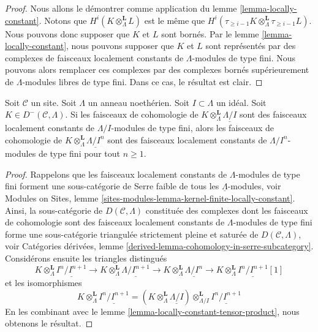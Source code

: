 \begin{proof}
Nous allons le démontrer comme application du lemme
\ref{lemma-locally-constant}. Notons que
$H^i(K \otimes_\Lambda^\mathbf{L} L)$ est le même que
$H^i(\tau_{\geq i - 1}K \otimes_\Lambda^\mathbf{L} \tau_{\geq i - 1}L)$.
Nous pouvons donc supposer que $K$ et $L$ sont bornés. Par le lemme
\ref{lemma-locally-constant}, nous pouvons supposer que $K$ et $L$ sont
représentés par des complexes de faisceaux localement constants de
$\Lambda$-modules de type fini. Nous pouvons alors remplacer ces complexes
par des complexes bornés supérieurement de $\Lambda$-modules libres de type
fini. Dans ce cas, le résultat est clair.
\end{proof}

\begin{lemma}
\label{lemma-locally-constant-bounded}
Soit $\mathcal{C}$ un site. Soit $\Lambda$ un anneau noethérien. Soit
$I \subset \Lambda$ un idéal. Soit $K \in D^-(\mathcal{C}, \Lambda)$. Si les
faisceaux de cohomologie de
$K \otimes_\Lambda^\mathbf{L} \underline{\Lambda/I}$ sont des faisceaux
localement constants de $\Lambda/I$-modules de type fini, alors les faisceaux
de cohomologie de
$K \otimes_\Lambda^\mathbf{L} \underline{\Lambda/I^n}$ sont des faisceaux
localement constants de $\Lambda/I^n$-modules de type fini pour tout
$n \geq 1$.
\end{lemma}

\begin{proof}
Rappelons que les faisceaux localement constants de $\Lambda$-modules de type
fini forment une sous-catégorie de Serre faible de tous les
$\underline{\Lambda}$-modules, voir Modules on Sites, lemme
\ref{sites-modules-lemma-kernel-finite-locally-constant}. Ainsi, la
sous-catégorie de $D(\mathcal{C}, \Lambda)$ constituée des complexes dont les
faisceaux de cohomologie sont des faisceaux localement constants de
$\Lambda$-modules de type fini forme une sous-catégorie triangulée strictement
pleine et saturée de $D(\mathcal{C}, \Lambda)$, voir Catégories dérivées,
lemme \ref{derived-lemma-cohomology-in-serre-subcategory}. Considérons ensuite
les triangles distingués
$$
K \otimes_\Lambda^\mathbf{L} \underline{I^n/I^{n + 1}} \to
K \otimes_\Lambda^\mathbf{L} \underline{\Lambda/I^{n + 1}} \to
K \otimes_\Lambda^\mathbf{L} \underline{\Lambda/I^n} \to
K \otimes_\Lambda^\mathbf{L} \underline{I^n/I^{n + 1}}[1]
$$
et les isomorphismes
$$
K \otimes_\Lambda^\mathbf{L} \underline{I^n/I^{n + 1}}
=
\left(K \otimes_\Lambda^\mathbf{L} \underline{\Lambda/I}\right)
\otimes_{\Lambda/I}^\mathbf{L} \underline{I^n/I^{n + 1}}
$$
En les combinant avec le lemme \ref{lemma-locally-constant-tensor-product},
nous obtenons le résultat.
\end{proof}












